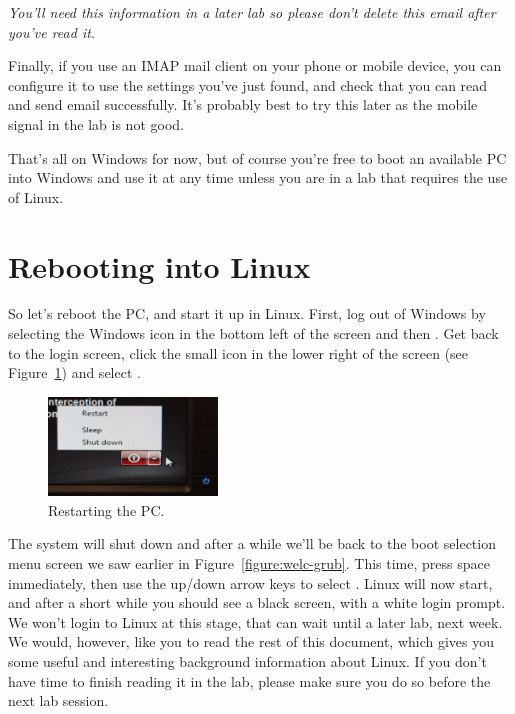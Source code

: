 \enlargethispage{\baselineskip}
\emph{You'll need this information in a later lab so please don't delete this email after you've read it.}


Finally, if you use an IMAP mail client on your phone or mobile
device, you can configure it to use the settings you've just found, and check
that you can read and send email successfully. It's probably best to try this later as the mobile signal in the lab is not good.

That's all on Windows for now, but of course  you're free to boot an available PC into Windows  and use it at any time unless you are in a lab that requires the use of Linux.

\section{Rebooting into Linux}
\label{sec:rebooting-into-linux}

So let's reboot the PC, and start it up in Linux. First, log out of
Windows by selecting the Windows icon in the bottom left of the screen and then . Get back to the login screen, click the
small icon in the lower right of the screen (see Figure~\ref{figure:welc-restart}) and select .

\begin{figure}
\centerline{\includegraphics[width=0.4\textwidth]{images/TH-shutdown-win}}
\caption{Restarting the PC.}
\label{figure:welc-restart}
\end{figure}

The system will shut down and after a while we'll be back to the boot selection menu
screen we saw earlier in Figure~\ref{figure:welc-grub}. This time, press space immediately, then use
the up/down arrow keys to select . Linux will now start, and after a short while you should
see a black screen, with a white login prompt. We won't login to Linux
at this stage, that can wait until a later lab, next week. We would,
however, like you to read the rest of this document, which gives you
some useful and interesting background information about Linux. If you
don't have time to finish reading it in the lab, please make sure you
do so before the next lab session.

